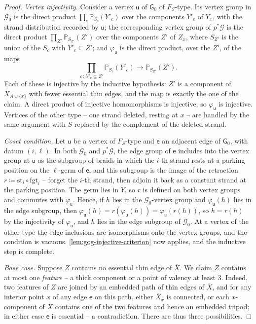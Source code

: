\documentclass[reqno]{amsart}
\theoremstyle{definition}
\newcommand\cG{\mathcal{G}}
\newcommand\sfG{\mathsf{G}}
\newcommand\sfe{\mathsf{e}}
\newcommand\sfu{\mathsf{u}}
\newcommand{\PB}{\mathbb{P}}
\renewcommand{\bar}{\overline}
\numberwithin{equation}{section}
\begin{document}
\begin{proof}
\emph{Vertex injectivity.} Consider a vertex \(\sfu\) of
\(\sfG_0\) of \(F_S\)-type. Its vertex group in \(\cG_0\) is
the direct product \(\prod_c\PB_{S_c}(Y'_c)\) over the
components \(Y'_c\) of \(Y_x\), with the strand distribution
recorded by \(\sfu\); the corresponding vertex group of
\(p^\ast\cG\) is the direct product
\(\prod_{Z'}\PB_{S_{Z'}}(Z')\) over the components \(Z'\) of
\(Z_x\), where \(S_{Z'}\) is the union of the \(S_c\) with
\(Y'_c\subseteq Z'\); and \(\varphi_{\sfu}\) is the direct
product, over the \(Z'\), of the maps
\[
\prod_{c\,:\,Y'_c\subseteq Z'}\PB_{S_c}(Y'_c)
\longrightarrow\PB_{S_{Z'}}(Z').
\]
Each of these is injective by the inductive hypothesis: \(Z'\)
is a component of \(\bar X_{A\cup\{x\}}\) with fewer essential
thin edges, and the map is exactly the one of the claim. A
direct product of injective homomorphisms is injective, so
\(\varphi_{\sfu}\) is injective. Vertices of the other type --
one strand deleted, resting at \(x\) -- are handled by the same
argument with \(S\) replaced by the complement of the deleted
strand.

\emph{Coset condition.} Let \(\sfu\) be a vertex of
\(F_S\)-type and \(\sfe\) an adjacent edge of \(\sfG_0\), with
datum \((i,\ell)\). In both \(\cG_0\) and \(p^\ast\cG\), the
edge group of \(\sfe\) includes into the vertex group at
\(\sfu\) as the subgroup of braids in which the \(i\)-th strand
rests at a parking position on the \(\ell\)-germ of \(\sfe\), and
this subgroup is the image of the retraction
\(r\coloneqq\mathrm{st}_i\circ\mathrm{fgt}_i\) -- forget the
\(i\)-th strand, then adjoin it back as a constant strand at
the parking position. The germ lies in \(Y\), so \(r\) is
defined on both vertex groups and commutes with
\(\varphi_{\sfu}\). Hence, if \(h\) lies in the
\(\cG_0\)-vertex group and \(\varphi_{\sfu}(h)\) lies in the
edge subgroup, then
\(\varphi_{\sfu}(h)=r(\varphi_{\sfu}(h))
=\varphi_{\sfu}(r(h))\), so \(h=r(h)\) by the injectivity of
\(\varphi_{\sfu}\), and \(h\) lies in the edge subgroup of
\(\cG_0\). At a vertex of the other type the edge inclusions
are isomorphisms onto the vertex groups, and the condition is
vacuous. \cref{lem:gog-injective-criterion} now applies, and
the inductive step is complete.

\emph{Base case.} Suppose \(Z\) contains no essential thin edge
of \(\bar X\). We claim \(Z\) contains at most one
\emph{feature} -- a thick component or a point of valency at
least \(3\). Indeed, two features of \(Z\) are joined by an
embedded path of thin edges of \(\bar X\), and for any interior
point \(x\) of any edge \(\sfe\) on this path, either \(\bar X_x\)
is connected, or each \(x\)-component of \(\bar X\) contains
one of the two features and hence an embedded tripod; in either
case \(\sfe\) is essential -- a contradiction. There are thus
three possibilities.


\end{proof}
\end{document}
